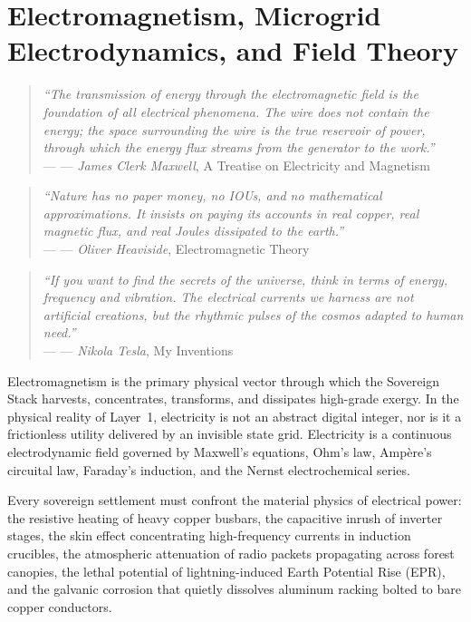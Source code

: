 \chapter{Electromagnetism, Microgrid Electrodynamics, and Field Theory}
\label{chap:layer1_electromagnetism}

\providecommand{\epigraph}[2]{%
  \begin{quote}
    \textit{#1} \\
    \raggedleft--- #2
  \end{quote}
}

\epigraph{
    ``The transmission of energy through the electromagnetic field is the foundation of all electrical phenomena. The wire does not contain the energy; the space surrounding the wire is the true reservoir of power, through which the energy flux streams from the generator to the work.''
}{--- \textit{James Clerk Maxwell}, \textnormal{A Treatise on Electricity and Magnetism} \cite{maxwell1873treatise}}

\epigraph{
    ``Nature has no paper money, no IOUs, and no mathematical approximations. It insists on paying its accounts in real copper, real magnetic flux, and real Joules dissipated to the earth.''
}{--- \textit{Oliver Heaviside}, \textnormal{Electromagnetic Theory} \cite{heaviside1893electromagnetic}}

\epigraph{
    ``If you want to find the secrets of the universe, think in terms of energy, frequency and vibration. The electrical currents we harness are not artificial creations, but the rhythmic pulses of the cosmos adapted to human need.''
}{--- \textit{Nikola Tesla}, \textnormal{My Inventions} \cite{tesla1919inventions}}

Electromagnetism is the primary physical vector through which the Sovereign Stack harvests, concentrates, transforms, and dissipates high-grade exergy. In the physical reality of Layer~1, electricity is not an abstract digital integer, nor is it a frictionless utility delivered by an invisible state grid. Electricity is a continuous electrodynamic field governed by Maxwell's equations, Ohm's law, Ampère's circuital law, Faraday's induction, and the Nernst electrochemical series.

Every sovereign settlement must confront the material physics of electrical power: the resistive heating of heavy copper busbars, the capacitive inrush of inverter stages, the skin effect concentrating high-frequency currents in induction crucibles, the atmospheric attenuation of radio packets propagating across forest canopies, the lethal potential of lightning-induced Earth Potential Rise (EPR), and the galvanic corrosion that quietly dissolves aluminum racking bolted to bare copper conductors. 

